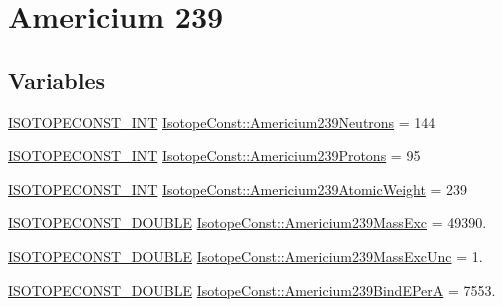 \hypertarget{group___isotope_const-_americium-_am239}{}\section{Americium 239}
\label{group___isotope_const-_americium-_am239}
\subsection*{Variables}
\begin{DoxyCompactItemize}
\item 
\mbox{\hyperlink{group___isotope_const-_macros_ga5f18360b3e99483a35c32d789e62621c}{I\+S\+O\+T\+O\+P\+E\+C\+O\+N\+S\+T\+\_\+\+I\+NT}} \mbox{\hyperlink{group___isotope_const-_americium-_am239_ga89205861e821c6c1f30c20907628a39a}{Isotope\+Const\+::\+Americium239\+Neutrons}} = 144
\item 
\mbox{\hyperlink{group___isotope_const-_macros_ga5f18360b3e99483a35c32d789e62621c}{I\+S\+O\+T\+O\+P\+E\+C\+O\+N\+S\+T\+\_\+\+I\+NT}} \mbox{\hyperlink{group___isotope_const-_americium-_am239_ga2e84cc9debc0f1265d3d19b2855d801d}{Isotope\+Const\+::\+Americium239\+Protons}} = 95
\item 
\mbox{\hyperlink{group___isotope_const-_macros_ga5f18360b3e99483a35c32d789e62621c}{I\+S\+O\+T\+O\+P\+E\+C\+O\+N\+S\+T\+\_\+\+I\+NT}} \mbox{\hyperlink{group___isotope_const-_americium-_am239_gadb26614f921e078e5e5812ee66eed771}{Isotope\+Const\+::\+Americium239\+Atomic\+Weight}} = 239
\item 
\mbox{\hyperlink{group___isotope_const-_macros_ga8f45a7272ce02c0b4c65c44636ed719a}{I\+S\+O\+T\+O\+P\+E\+C\+O\+N\+S\+T\+\_\+\+D\+O\+U\+B\+LE}} \mbox{\hyperlink{group___isotope_const-_americium-_am239_ga58d21d8eea254cf5225a6148b32a3838}{Isotope\+Const\+::\+Americium239\+Mass\+Exc}} = 49390.
\item 
\mbox{\hyperlink{group___isotope_const-_macros_ga8f45a7272ce02c0b4c65c44636ed719a}{I\+S\+O\+T\+O\+P\+E\+C\+O\+N\+S\+T\+\_\+\+D\+O\+U\+B\+LE}} \mbox{\hyperlink{group___isotope_const-_americium-_am239_ga2c46f31368d7bdced60ab2104feb33f7}{Isotope\+Const\+::\+Americium239\+Mass\+Exc\+Unc}} = 1.
\item 
\mbox{\hyperlink{group___isotope_const-_macros_ga8f45a7272ce02c0b4c65c44636ed719a}{I\+S\+O\+T\+O\+P\+E\+C\+O\+N\+S\+T\+\_\+\+D\+O\+U\+B\+LE}} \mbox{\hyperlink{group___isotope_const-_americium-_am239_gaf845a7d9ccbfa816853a573a3c6f7569}{Isotope\+Const\+::\+Americium239\+Bind\+E\+PerA}} = 7553.
\item 

\end{DoxyCompactItemize}
